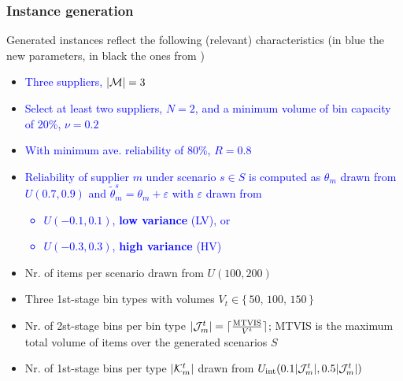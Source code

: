 \documentclass[9pt,xcolor={dvipsnames}]{beamer}
\begin{document}
\begin{frame}%
	\frametitle{Instance generation}
	Generated instances reflect the following (relevant) characteristics (in blue the new parameters, in black the ones from \cite{crainic2024})
	\begin{itemize}
		\small
		\medskip
		\item<1-> \textcolor{blue}{Three suppliers, $|{\cal M}| = 3$}
		\medskip
		\item<2-> \textcolor{blue}{Select at least two suppliers, $N = 2$, and a minimum volume of bin capacity of 20\%, $\nu = 0.2$}
		\medskip
		\item<3-> \textcolor{blue}{With minimum ave. reliability of 80\%, $R = 0.8$}
		\medskip
		\item<4-> \textcolor{blue}{Reliability of supplier $ m$ under scenario $ s \in S$ is computed as $\theta_{m}$ drawn from $U(0.7, 0.9)$ and $ \tilde{\theta}^s_m = \theta_m + \varepsilon$ with $  \varepsilon $ drawn from
		\begin{itemize}
			\small
			\item<4->  \textcolor{blue}{$ U(-0.1, 0.1)$, \textbf{low variance} (LV), or}
			\item<5->  \textcolor{blue}{$ U(-0.3, 0.3)$, \textbf{high variance} (HV)}
		\end{itemize}}
		\medskip
		\item<6-> Nr. of items per scenario drawn from $U(100, 200)$
		\medskip
		\item<7-> Three 1st-stage bin types with volumes $ V_t \in \{ \, 50, \, 100, \, 150 \, \}$
		\medskip
		\item<8-> Nr. of 2st-stage bins per bin type $ | {\cal J}^t_m | = \lceil \frac{\text{MTVIS}}{V^t} \rceil $; MTVIS is the maximum total volume of items over the generated scenarios $ S$
		\medskip
		\item<9-> Nr. of 1st-stage bins per type $ | {\cal K}^t_m |$ drawn from $ U_{\text{int}}( 0.1 | {\cal J}^t_m |, 0.5 | {\cal J}^t_m |)$
	\end{itemize}
\end{frame}
\end{document}
